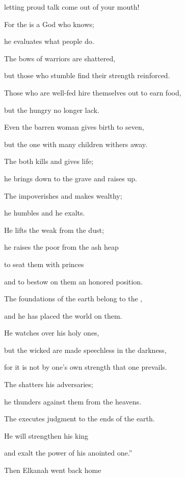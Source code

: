 {\par }{\Q letting
proud talk come out
of your mouth!
\par }{\Q For
the {}
is
a God
who knows;
\par }{\Q he evaluates what people do.
\par }{\Q {}The bows
of warriors
are shattered,
\par }{\Q but those who stumble
find their strength
reinforced.
\par }{\Q {}Those who are well-fed
hire
themselves out to earn food,
\par }{\Q but the hungry
no longer lack.
\par }{\Q Even
the barren
woman gives birth
to seven,
\par }{\Q but the one with many
children
withers away.
\par }{\Q {}The
{}
both kills
and gives life;
\par }{\Q he brings down
to the grave
and raises up.
\par }{\Q {}The
{}
impoverishes
and makes wealthy;
\par }{\Q he humbles
and he exalts.
\par }{\Q {}He lifts
the weak
from the dust;
\par }{\Q he raises
the poor
from the ash heap
\par }{\Q to seat
them with
princes
\par }{\Q and to bestow
on them an honored position.
\par }{\Q The foundations
of the earth
belong to the
{},
\par }{\Q and he has placed
the world
on them.
\par }{\Q {}He watches
over
his holy ones,
\par }{\Q but the wicked
are made speechless
in the darkness,
\par }{\Q for
it is not
by one’s own strength
that one
prevails.
\par }{\Q {}The
{}
shatters
his adversaries;
\par }{\Q he thunders
against
them
from the heavens.
\par }{\Q The
{}
executes
judgment to the ends
of the earth.
\par }{\Q He will
strengthen his
king
\par }{\Q and exalt
the power
of his anointed one.”
\par }{\PP {}Then Elkanah
went
back home
}
